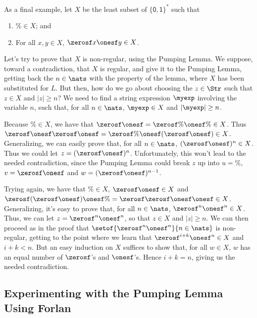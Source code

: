 As a final example, let $X$ be the least subset of
$\{\mathsf{0,1}\}^*$ such that
\begin{enumerate}[\quad(1)]
\item $\%\in X$; and

\item For all $x,y\in X$, $\zerosf x\onesf y\in X$.
\end{enumerate}
Let's try to prove that $X$ is non-regular, using the Pumping Lemma.
We suppose, toward a contradiction, that $X$ is regular, and give it
to the Pumping Lemma, getting back the $n\in\nats$ with the property
of the lemma, where $X$ has been substituted for $L$.  But then, how
do we go about choosing the $z\in\Str$ such that $z\in X$ and $|z|\geq
n$?  We need to find a string expression $\myexp$ involving the
variable $n$, such that, for all $n\in\nats$, $\myexp\in X$
and $|\myexp|\geq n$.

Because $\%\in X$, we have that $\zerosf\onesf=\zerosf\%\onesf\%\in
X$.  Thus
$\zerosf\onesf\zerosf\onesf=\zerosf\%\onesf(\zerosf\onesf)\in X$.
Generalizing, we can easily prove that, for all $n\in\nats$,
$(\zerosf\onesf)^n\in X$.  Thus we could let $z=(\zerosf\onesf)^n$.
Unfortunately, this won't lead to the needed contradiction, since the
Pumping Lemma could break $z$ up into $u=\%$, $v=\zerosf\onesf$ and
$w=(\zerosf\onesf)^{n-1}$.

Trying again, we have that $\%\in X$, $\zerosf\onesf\in X$ and
$\zerosf(\zerosf\onesf)\onesf\%=\zerosf\zerosf\onesf\onesf\in X$.
Generalizing, it's easy to prove that, for all $n\in\nats$,
$\zerosf^n\onesf^n\in X$.  Thus, we can let $z=\zerosf^n\onesf^n$, so
that $z\in X$ and $|z|\geq n$.  We can then proceed as in the proof
that $\setof{\zerosf^n\onesf^n}{n\in\nats}$ is non-regular, getting to
the point where we learn that $\zerosf^{i+k}\onesf^n\in X$ and
$i+k<n$.  But an easy induction on $X$ suffices to show that, for all
$w\in X$, $w$ has an equal number of $\zerosf$'s and $\onesf$'s.
Hence $i+k=n$, giving us the needed contradiction.
%
%

\subsection{Experimenting with the Pumping Lemma Using Forlan}

